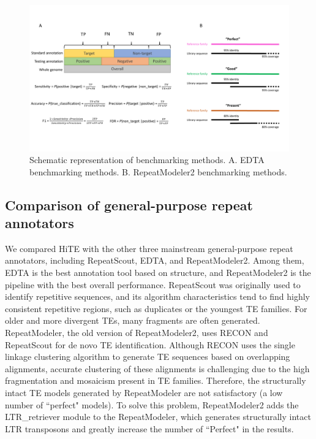 \documentclass{bmcart}
\begin{document}
\begin{figure}[h!]
	\centerline{\includegraphics[width=1.0\textwidth]{figures/EvaluationMethods.pdf}}
	\caption{Schematic representation of benchmarking methods. A. EDTA benchmarking methods. B. RepeatModeler2 benchmarking methods.}
	\label{fig:benchmarking_methods}
\end{figure}


\subsection*{Comparison of general-purpose repeat annotators}
We compared HiTE with the other three mainstream general-purpose repeat annotators, including RepeatScout, EDTA, and RepeatModeler2. Among them, EDTA is the best annotation tool based on structure, and RepeatModeler2 is the pipeline with the best overall performance. RepeatScout was originally used to identify repetitive sequences, and its algorithm characteristics tend to find highly consistent repetitive regions, such as duplicates or the youngest TE families. For older and more divergent TEs, many fragments are often generated. RepeatModeler, the old version of RepeatModeler2, uses RECON and RepeatScout for de novo TE identification. Although RECON uses the single linkage clustering algorithm to generate TE sequences based on overlapping alignments, accurate clustering of these alignments is challenging due to the high fragmentation and mosaicism present in TE families\cite{storer2022methodologies}. Therefore, the structurally intact TE models generated by RepeatModeler are not satisfactory (a low number of ``perfect" models). To solve this problem, RepeatModeler2 adds the LTR\_retriever module to the RepeatModeler, which generates structurally intact LTR transposons and greatly increase the number of ``Perfect" in the results\cite{flynn2020repeatmodeler2}.
\end{document}
